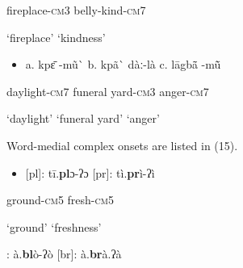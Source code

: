 \begin{styleindexi}
                fireplace-\textsc{cm}3                                  belly-kind-\textsc{cm}7 
\end{styleindexi}

\begin{styleindexi}
                ‘fireplace’                                      ‘kindness’
\end{styleindexi}

\begin{itemize}
\item \begin{styleindexi}
     a.   kpɛ\={} -mũ\`{}                        b.     kpã\`{} dàː-là                      c.  lāgbã\={} -mũ\={} ~ ~
\end{styleindexi}\end{itemize}
\begin{styleindexi}
                daylight-\textsc{cm}7                  funeral yard-\textsc{cm}3                anger-\textsc{cm7}
\end{styleindexi}

\begin{styleindexi}
                ‘daylight’                      ‘funeral yard’                    ‘anger’
\end{styleindexi}

Word-medial complex onsets are listed in (15).

\begin{itemize}
\item \begin{styleindexi}
     \label{bkm:Ref501037612}\label{bkm:Ref467151704}[pl]:    tī.\textbf{pl}ɔ{}-ʔɔ                                     [pr]:     tì.\textbf{pr}ì-ʔì           
\end{styleindexi}\end{itemize}
\begin{styleindexi}
                    ground-\textsc{cm}5                                          fresh-\textsc{cm}5  
\end{styleindexi}

\begin{styleindexi}
                    ‘ground’                                                ‘freshness’
\end{styleindexi}

\begin{styleindexi}
            [bl]:    à.\textbf{bl}ò-ʔò                                      [br]:    à.\textbf{br}à.ʔà             
\end{styleindexi}

